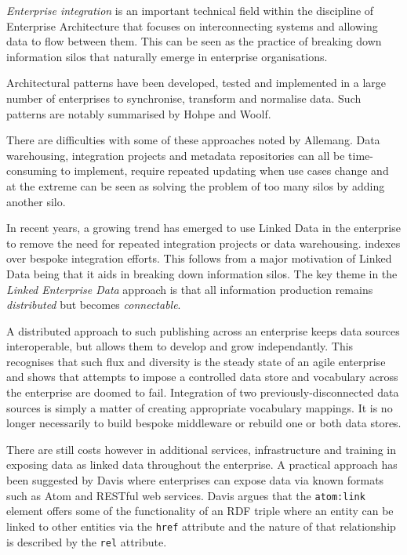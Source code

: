 \emph{Enterprise integration} is an important technical field within the
discipline of Enterprise Architecture that focuses on interconnecting
systems and allowing data to flow between them. This can be seen as
the practice of breaking down information silos that naturally emerge
in enterprise organisations.\cite{allemang2010semantic}

Architectural patterns have been developed, tested and
implemented in a large number of enterprises to synchronise,
transform and normalise data. Such patterns are notably
summarised by Hohpe and Woolf.\cite{hohpe2004enterprise}

There are difficulties with some of these approaches noted by
Allemang\cite{allemang2010semantic}. Data warehousing,
integration projects and metadata repositories can all
be time-consuming to implement, require repeated updating when
use cases change and at the extreme can be seen as solving the
problem of too many silos by adding another silo.

In recent years, a growing trend has emerged to use
Linked Data in the enterprise to remove the need
for repeated integration projects or data warehousing.
indexes over bespoke integration efforts. This follows from
a major motivation of Linked Data being that it aids in breaking
down information silos.\cite{bizer2009linked} The key theme
in the \emph{Linked Enterprise Data} approach is that all information
production remains \emph{distributed} but becomes
\emph{connectable}.\cite{allemang2010semantic}

A distributed
approach to such publishing across an enterprise keeps data sources
interoperable, but allows them to develop and grow independantly. This
recognises that such flux and diversity is the steady state of
an agile enterprise and shows that attempts to impose a controlled
data store and vocabulary across the enterprise are doomed to fail.
Integration of two previously-disconnected data sources is simply
a matter of creating appropriate vocabulary mappings. It is no
longer necessarily to build bespoke middleware or rebuild one or
both data stores.

There are still costs however in additional services, infrastructure
and training in exposing data as linked data throughout the
enterprise.\cite{hyland2010preparing} A practical approach
has been suggested by Davis\cite{davis2011achieving} where enterprises
can expose data via known formats such as Atom\cite{nottingham2005atom}
and RESTful web services. Davis argues that the \texttt{atom:link}
element offers some of the functionality of an RDF triple where
an entity can be linked to other entities via the \texttt{href}
attribute and the nature of that relationship is described by
the \texttt{rel} attribute.

